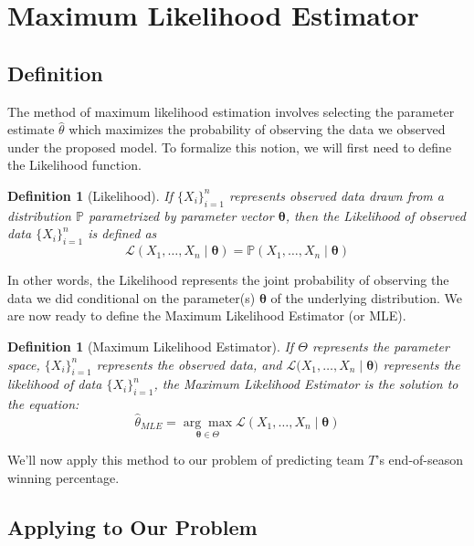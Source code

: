 \documentclass[twoside]{article}
\newtheorem{definition}[theorem]{Definition}
\theoremstyle{definition}
\begin{document}
\section{Maximum Likelihood Estimator}

\subsection{Definition}

The method of maximum likelihood estimation involves selecting the parameter estimate $\widehat{\theta}$ which maximizes the probability of observing the data we observed under the proposed model. To formalize this notion, we will first need to define the Likelihood function.

\begin{definition}[Likelihood]\label{def:likelihood}
    If $\{X_i\}_{i=1}^n$ represents observed data drawn from a distribution $\mathbb{P}$ parametrized by parameter vector $\boldsymbol{\theta}$, then the Likelihood of observed data $\{X_i\}_{i=1}^n$ is defined as
    \begin{equation}
        \mathcal{L}(X_1, \hdots, X_n \mid \boldsymbol{\theta}) = \mathbb{P}(X_1, \hdots, X_n \mid \boldsymbol{\theta})
    \end{equation}
\end{definition}
In other words, the Likelihood represents the joint probability of observing the data we did conditional on the parameter(s) $\boldsymbol{\theta}$ of the underlying distribution. We are now ready to define the Maximum Likelihood Estimator (or MLE).

\begin{definition}[Maximum Likelihood Estimator]\label{def:mle}
    If $\Theta$ represents the parameter space, $\{X_i\}_{i = 1}^n$ represents the observed data, and $\mathcal{L}(X_1, \hdots, X_n \mid \boldsymbol{\theta)}$ represents the likelihood of data $\{X_i\}_{i=1}^n$, the Maximum Likelihood Estimator is the solution to the equation:
    \begin{equation}
        \widehat{\theta}_{MLE} = \underset{\boldsymbol{\theta} \in \Theta}{\arg\max} \mathcal{L}(X_1, \hdots, X_n \mid \boldsymbol{\theta})
    \end{equation}
\end{definition}
We'll now apply this method to our problem of predicting team $T$'s end-of-season winning percentage.

\subsection{Applying to Our Problem}
\end{document}

